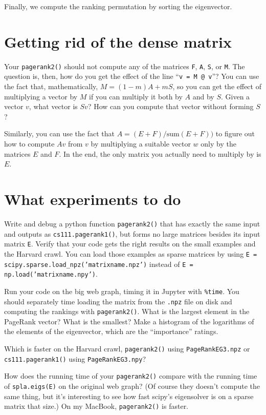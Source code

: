 \documentclass[11pt]{article}
\begin{document}
Finally, we compute the ranking permutation by sorting the eigenvector.

\section{Getting rid of the dense matrix}

Your {\tt pagerank2()} should not compute any of the
matrices {\tt F}, {\tt A}, {\tt S}, or {\tt M}.
The question is, then, how do you get the effect
of the line ``{\tt v = M @ v}''?
You can use the fact that, mathematically,
$M = (1-m)A + mS$,
so you can get the effect of multiplying a vector by $M$
if you can multiply it both by $A$ and by $S$.
Given a vector $v$, what vector is $Sv$?
How can you compute that vector without forming $S$?

Similarly, you can use the fact that $A = (E+F)/\mbox{sum}(E+F))$
to figure out how to compute $Av$ from $v$ by
multiplying a suitable vector $w$ only by the matrices
$E$ and $F$.
In the end, the only matrix you actually need to
multiply by is $E$.

\section{What experiments to do}

Write and debug a python function {\tt pagerank2()} that has
exactly the same input and outputs as {\tt cs111.pagerank1()},
but forms no large matrices besides its input matrix {\tt E}.
Verify that your code gets the right results
on the small examples and the Harvard crawl.
You can load those examples as sparse matrices by using
{\tt E = scipy.sparse.load\_npz('matrixname.npz')} instead of
{\tt E = np.load('matrixname.npy')}.

Run your code on the big web graph, timing it in Jupyter
with {\tt \%time}.
You should separately time loading the matrix from the {\tt .npz}
file on disk and computing the rankings with {\tt pagerank2()}.
What is the largest element in the PageRank vector?
What is the smallest?
Make a histogram of the logarithms of the elements of the
eigenvector, which are the ``importance'' ratings.

Which is faster on the Harvard crawl, 
{\tt pagerank2()} using {\tt PageRankEG3.npz} or
{\tt cs111.pagerank1()} using {\tt PageRankEG3.npy}?

How does the running time of your {\tt pagerank2()} compare with the
running time of {\tt spla.eigs(E)} on the original web graph?
(Of course they doesn't compute the same thing, but it's interesting
to see how fast scipy's eigensolver is on a sparse matrix that size.)
On my MacBook, {\tt pagerank2()} is faster.
\end{document}
